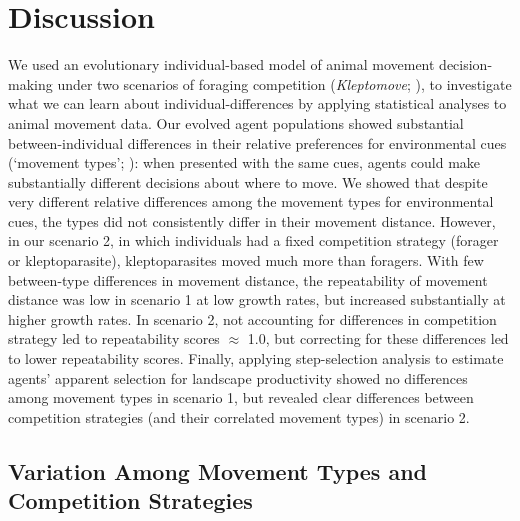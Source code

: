     \section*{Discussion}
    
    
    We used an evolutionary individual-based model of animal movement decision-making under two scenarios of foraging competition (\textit{Kleptomove}; \citealt{gupte2021a,netz2022a}), to investigate what we can learn about individual-differences by applying statistical analyses to animal movement data.
    Our evolved agent populations showed substantial between-individual differences in their relative preferences for environmental cues (`movement types'; \citealt{getz2015}): when presented with the same cues, agents could make substantially different decisions about where to move.
    We showed that despite very different relative differences among the movement types for environmental cues, the types did not consistently differ in their movement distance.
    However, in our scenario 2, in which individuals had a fixed competition strategy (forager or kleptoparasite), kleptoparasites moved much more than foragers.
    With few between-type differences in movement distance, the repeatability of movement distance was low in scenario 1 at low growth rates, but increased substantially at higher growth rates.
    In scenario 2, not accounting for differences in competition strategy led to repeatability scores $\approx$ 1.0, but correcting for these differences led to lower repeatability scores.
    Finally, applying step-selection analysis to estimate agents' apparent selection for landscape productivity showed no differences among movement types in scenario 1, but revealed clear differences between competition strategies (and their correlated movement types) in scenario 2.
    
    \subsection*{Variation Among Movement Types and Competition Strategies}
    
